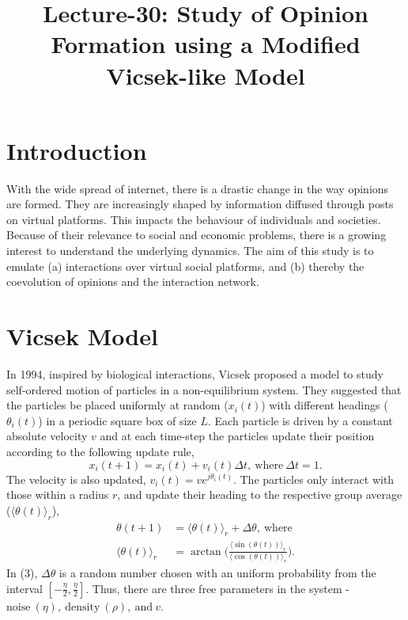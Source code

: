 \documentclass[letterpaper,english,11pt]{article}
\title{Lecture-30: Study of Opinion Formation using a Modified Vicsek-like Model}
\begin{document}
\maketitle
\section{Introduction}

 With the wide spread of internet, there is a drastic change in the way opinions are formed. They are increasingly shaped by information diffused through posts on virtual platforms. This impacts the behaviour of individuals and societies. Because of their relevance to social and economic problems, there is a growing interest to understand the underlying dynamics. The aim of this study is to emulate (a) interactions over virtual social platforms, and (b) thereby the coevolution of opinions and the interaction network.

\section{Vicsek Model}

In 1994, inspired by biological interactions, Vicsek proposed a model to study self-ordered motion of particles in a non-equilibrium system. They suggested that the particles be placed uniformly at random ($x_{i}(t)$) with different headings ($\theta_{i}(t)$) in a periodic square box of size $L$.  Each particle is driven by a constant absolute velocity $v$ and at each time-step the particles update their position according to the following update rule, 
\begin{equation}
x_{i}(t+1)= x_{i}(t)+ v_{i}(t)\Delta t,~\text{where}~\Delta t = 1.
 \end{equation}
The velocity is also updated, $v_{i}(t) = v e^{j\theta_{i}(t)}.$ The particles only interact with those within a radius $r$, and update their heading to the respective group average ($\langle \theta(t)\rangle_{r}$), 
\begin{align}
\theta(t+1) &= \langle \theta(t)\rangle_{r} +\Delta \theta,~\text{where} \\
\langle \theta(t)\rangle_{r} &= \arctan \bigg(\frac{\langle\sin(\theta(t))\rangle_{r}}{\langle\cos(\theta(t))\rangle_{r}}\bigg).
\end{align}
In (3), $\Delta \theta$ is a random number chosen with an uniform probability from the interval $[-\frac{\eta}{2},\frac{\eta}{2}]$. Thus, there are three free parameters in the system - $\text{noise}~(\eta),~\text{density}~(\rho),~\text{and}~v$. 
\end{document}
